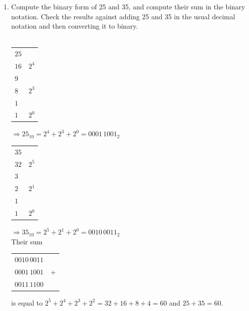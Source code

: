 \documentclass[10pt,a4paper,final]{article}
\begin{document}
\begin{enumerate}
\item %
Compute the binary form of 25 and 35, and compute
their sum in the binary notation. Check the results
against adding 25 and 35 in the usual decimal notation
and then converting it to binary.\\
\\
\begin{tabular}{l | l}
\cline{1-1}
$25$\\
$16$ & $2^4$\\
\cline{1-1}
$9$\\
$8$ & $2^3$\\
\cline{1-1}
$1$\\
$1$ & $2^0$\\
\end{tabular}
$\Rightarrow 25_{10} = 2^4 + 2^3 + 2^0 = 0001\,1001_2\qquad$
\begin{tabular}{l | l}
\cline{1-1}
$35$\\
$32$ & $2^5$\\
\cline{1-1}
$3$\\
$2$ & $2^1$\\
\cline{1-1}
$1$\\
$1$ & $2^0$\\
\end{tabular}
$\Rightarrow 35_{10} = 2^5 + 2^1 + 2^0 = 0010\,0011_2$\\
Their sum
\begin{tabular}{c l}
$0010\,0011$\\
$0001\,1001$ & +\\
\hline
$0011\,1100$
\end{tabular}
is equal to $2^5 + 2^4 + 2^3 + 2^2 = 32 + 16 + 8 + 4 = 60$
and $25 + 35 = 60$.


\end{enumerate}
\end{document}
